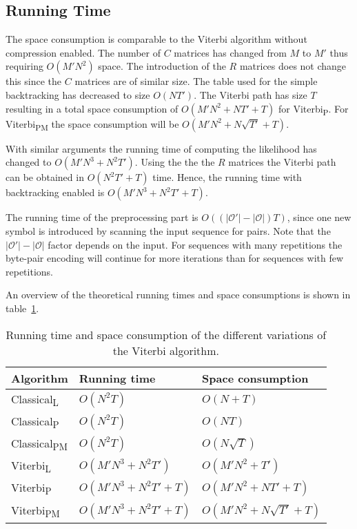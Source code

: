 \subsection{Running Time}
\label{sec:running-time}

The space consumption is comparable to the Viterbi algorithm without
compression enabled. The number of $C$ matrices has changed from $M$ to $M'$
thus requiring $O(M' N^2)$ space. The introduction of the $R$ matrices does not
change this since the $C$ matrices are of similar size. The table used for the
simple backtracking has decreased to size $O(N T')$. The Viterbi path has size
$T$ resulting in a total space consumption of $O(M' N^2 + N T' + T)$ for
Viterbi\textsubscript{P}. For Viterbi\textsubscript{PM} the space consumption will be
$O(M' N^2 + N \sqrt{T'} + T)$.

With similar arguments the running time of computing the likelihood has changed
to $O(M' N^3 +N^2 T')$. Using the the the $R$ matrices the Viterbi path can be
obtained in $O(N^2 T' + T)$ time. Hence, the running time with backtracking
enabled is $O(M' N^3 +N^2 T' + T)$.

The running time of the preprocessing part is $O(
(
  \lvert\mathcal{O'}\rvert - \lvert{\mathcal{O}}\rvert
) T)$, since one new symbol is introduced by scanning the input sequence for
pairs. Note that the $\lvert\mathcal{O'}\rvert - \lvert{\mathcal{O}}\rvert$
factor depends on the input. For sequences with many repetitions the byte-pair
encoding will continue for more iterations than for sequences with few
repetitions.

An overview of the theoretical running times and space consumptions is shown in
table~\ref{tab:running-time}.

\begin{table}
  \centering
  \caption{Running time and space consumption of the different variations of the
    Viterbi algorithm.}
  \label{tab:running-time}
  \begin{tabular}{lll}
    \toprule
    Algorithm                   & Running time             & Space consumption             \\
    \midrule
    Classical\textsubscript{L}  & $O(N^2 T)$               & $O(N + T)$                    \\
    Classical\textsubscript{P}  & $O(N^2 T)$               & $O(NT)$                       \\
    Classical\textsubscript{PM} & $O(N^2 T)$               & $O(N\sqrt{T})$                \\
    Viterbi\textsubscript{L}    & $O(M' N^3 + N^2 T')$     & $O(M' N^2 + T')$              \\
    Viterbi\textsubscript{P}    & $O(M' N^3 + N^2 T' + T)$ & $O(M' N^2 + N T' + T)$        \\
    Viterbi\textsubscript{PM}   & $O(M' N^3 + N^2 T' + T)$ & $O(M' N^2 + N \sqrt{T'} + T)$ \\
    \bottomrule
  \end{tabular}
\end{table}

